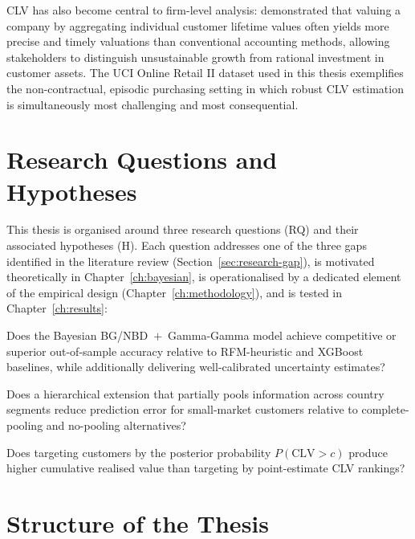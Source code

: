 \documentclass[12pt, a4paper, oneside]{report}
\begin{document}
CLV has also become central to firm-level analysis: \textcite{mccarthy2018} demonstrated that valuing a company by aggregating individual customer lifetime values often yields more precise and timely valuations than conventional accounting methods, allowing stakeholders to distinguish unsustainable growth from rational investment in customer assets. The UCI Online Retail II dataset used in this thesis exemplifies the non-contractual, episodic purchasing setting in which robust CLV estimation is simultaneously most challenging and most consequential.

\section{Research Questions and Hypotheses}
\label{sec:rqs}

This thesis is organised around three research questions (RQ) and their associated hypotheses (H). Each question addresses one of the three gaps identified in the literature review (Section~\ref{sec:research-gap}), is motivated theoretically in Chapter~\ref{ch:bayesian}, is operationalised by a dedicated element of the empirical design (Chapter~\ref{ch:methodology}), and is tested in Chapter~\ref{ch:results}:

\begin{description}[leftmargin=2.2em, style=nextline]
  \item[RQ1 / H1: Accuracy and calibrated uncertainty.] Does the Bayesian BG/NBD~$+$~Gamma-Gamma model achieve competitive or superior out-of-sample accuracy relative to RFM-heuristic and XGBoost baselines, while additionally delivering well-calibrated uncertainty estimates?
  \item[RQ2 / H2: Hierarchical partial pooling.] Does a hierarchical extension that partially pools information across country segments reduce prediction error for small-market customers relative to complete-pooling and no-pooling alternatives?
  \item[RQ3 / H3: Decision-theoretic targeting.] Does targeting customers by the posterior probability $P(\text{CLV} > c)$ produce higher cumulative realised value than targeting by point-estimate CLV rankings?
\end{description}

\section{Structure of the Thesis}
\label{sec:structure}
\end{document}
